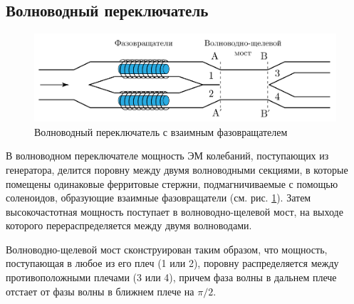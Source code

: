 \subsection{Волноводный переключатель}
\begin{figure}[h!]
    \centering
    \includegraphics[width = 0.95\linewidth]{imgs/switcher.pdf}
    \caption{Волноводный переключатель с взаимным фазовращателем}
    \label{fig:ex:1}
\end{figure}
В волноводном переключателе мощность ЭМ колебаний, поступающих из генератора, делится поровну между
двумя волноводными секциями, в которые помещены одинаковые ферритовые стержни, подмагничиваемые с помощью соленоидов,
образующие взаимные фазовращатели
(см. рис. \ref{fig:ex:1}).
Затем высокочастотная мощность поступает в волноводно-щелевой мост, на
выходе которого перераспределяется между двумя волноводами.

Волноводно-щелевой мост сконструирован таким образом, что мощность, поступающая в любое из его плеч (1 или 2), поровну
распределяется между противоположными плечами (3 или 4), причем фаза волны в дальнем плече отстает от фазы волны в
ближнем плече на $\pi/2$. 

